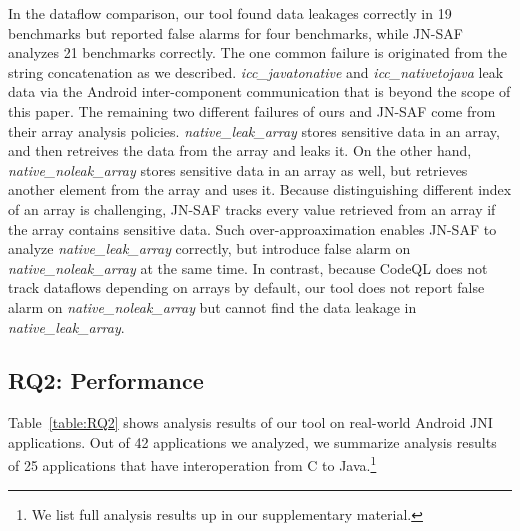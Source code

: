 In the dataflow comparison, our tool found data leakages correctly in 19
benchmarks but reported false alarms for four benchmarks, while JN-SAF analyzes
21 benchmarks correctly. The one common failure is originated from the string
concatenation as we described. {\it icc\_javatonative} and {\it
icc\_nativetojava} leak data via the Android inter-component communication that
is beyond the scope of this paper. The remaining two different failures of ours
and JN-SAF come from their array analysis policies. {\it native\_leak\_array}
stores sensitive data in an array, and then retreives the data from the array
and leaks it. On the other hand, {\it native\_noleak\_array} stores sensitive
data in an array as well, but retrieves another element from the array and uses
it. Because distinguishing different index of an array is challenging, JN-SAF
tracks every value retrieved from an array if the array contains sensitive
data. Such over-approaximation enables JN-SAF to analyze {\it
native\_leak\_array} correctly, but introduce false alarm on {\it
native\_noleak\_array} at the same time. In contrast, because CodeQL does not
track dataflows depending on arrays by default, our tool does not report false
alarm on {\it native\_noleak\_array} but cannot find the data leakage in {\it
native\_leak\_array}.


\subsection{RQ2: Performance}
Table~\ref{table:RQ2} shows analysis results of our tool on real-world Android
JNI applications. Out of 42 applications we analyzed, we summarize analysis
results of 25 applications that have interoperation from C to Java.\footnote{We
list full analysis results up in our supplementary material.} 



